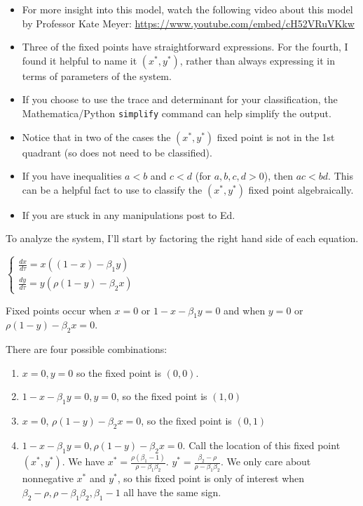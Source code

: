 \documentclass[12pt,letterpaper]{exam}
\begin{document}
\begin{questions}
\begin{parts}
\begin{itemize}
    \item For more insight into this model, watch the following video about this model by Professor Kate Meyer: \url{https://www.youtube.com/embed/cH52VRuVKkw}
    \item Three of the fixed points have straightforward expressions.  For the fourth, I found it helpful to name it $(x^*,y^*)$, rather than always expressing it in terms of parameters of the system.
    \item If you choose to use the trace and determinant for your classification, the Mathematica/Python  \texttt{simplify} command can help simplify the output.
    \item Notice that in two of the cases the $(x^*,y^*)$ fixed point is not in the 1st quadrant (so does not need to be classified).
    \item If you have inequalities $a<b$ and $c<d$ (for $a,b,c,d>0$), then $ac<bd$.  This can be a helpful fact to use to classify the $(x^*,y^*)$ fixed point algebraically.
    \item If you are stuck in any  manipulations post to Ed.
\end{itemize}

\begin{solution}

To analyze the system, I'll start by factoring the right hand side of each equation.

$\left\{\begin{array}{l} \frac{dx}{d\tau} =   x\left( (1-x ) - \beta_1  y\right) \\  \frac{dy}{d\tau} =  y\left(\rho (1-y) - \beta_2 x\right)\end{array}\right.$

Fixed points occur when $x = 0$ or $1-x - \beta_1 y = 0$ and when $y = 0$ or $\rho(1-y) - \beta_2 x = 0$.

There are four possible combinations:
\begin{enumerate}
\item $x = 0, y = 0$ so the fixed point is $(0,0)$.
\item  $1 - x - \beta_1 y = 0, y = 0$, so the fixed point is $(1,0)$
\item   $x = 0$, $\rho(1-y)-\beta_2 x = 0$, so the fixed point is $(0,1)$
\item  $1-x-\beta_1 y = 0, \rho(1-y) - \beta_2 x = 0$.  Call the location of this fixed point $(x^*, y^*)$.  We have $\displaystyle x^* = \frac{\rho(\beta_1 - 1)}{\rho - \beta_1 \beta_2}$.  $\displaystyle y^* = \frac{\beta_2 - \rho}{\rho - \beta_1 \beta_2}$.  We only care about nonnegative $x^*$ and $y^*$, so this fixed point is only of interest when $\beta_2 - \rho, \rho - \beta_1\beta_2, \beta_1 - 1$ all have the same sign.
\end{enumerate}


\end{solution}
\end{parts}
\end{questions}
\end{document}
